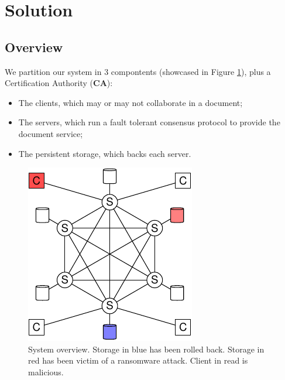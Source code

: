 \section{Solution}

\subsection{Overview}

We partition our system in 3 compontents (showcased in
Figure \ref{fig:overview}), plus a Certification Authority (\textbf{CA}):
\begin{itemize}
    \setlength{\itemsep}{0pt}
    \setlength{\parskip}{0pt}
    \setlength{\parsep}{0pt}
    \item The clients, which may or may not collaborate in a
        document;
    \item The servers, which run a fault tolerant consensus
        protocol to provide the document service;
    \item The persistent storage, which backs each server.
\end{itemize}

\begin{figure}[ht]
    \centering
    \includegraphics[width=.5\linewidth]{img/sys-1}
    \caption{System overview. Storage in blue has been rolled
    back. Storage in red has been victim of a ransomware attack.
    Client in read is malicious.}
    \label{fig:overview}
\end{figure}

